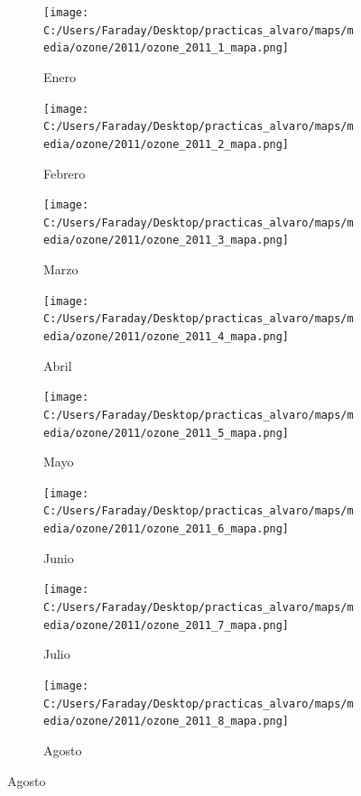 \documentclass[12pt]{beamer}
\begin{document}
\begin{frame}[squeeze]
\tiny
\begin{figure}[H]
\centering
\begin{subfigure}[H]{0.20\textwidth}
\texttt{[image: C:/Users/Faraday/Desktop/practicas\_alvaro/maps/media/ozone/2011/ozone\_2011\_1\_mapa.png]}
\captionsetup{labelformat=empty}
\caption{\scriptsize Enero}
\label{fig:map-ozone-2011-1}
\end{subfigure}
%
\begin{subfigure}[H]{0.20\textwidth}
\texttt{[image: C:/Users/Faraday/Desktop/practicas\_alvaro/maps/media/ozone/2011/ozone\_2011\_2\_mapa.png]}
\captionsetup{labelformat=empty}
\caption{\scriptsize Febrero}
\label{fig:map-ozone-2011-2}
\end{subfigure}
%
\begin{subfigure}[H]{0.20\textwidth}
\texttt{[image: C:/Users/Faraday/Desktop/practicas\_alvaro/maps/media/ozone/2011/ozone\_2011\_3\_mapa.png]}
\captionsetup{labelformat=empty}
\caption{\scriptsize Marzo}
\label{fig:map-ozone-2011-3}
\end{subfigure}
%
\begin{subfigure}[H]{0.20\textwidth}
\texttt{[image: C:/Users/Faraday/Desktop/practicas\_alvaro/maps/media/ozone/2011/ozone\_2011\_4\_mapa.png]}
\captionsetup{labelformat=empty}
\caption{\scriptsize Abril}
\label{fig:map-ozone-2011-4}
\end{subfigure}

\begin{subfigure}[H]{0.20\textwidth}
\texttt{[image: C:/Users/Faraday/Desktop/practicas\_alvaro/maps/media/ozone/2011/ozone\_2011\_5\_mapa.png]}
\captionsetup{labelformat=empty}
\caption{\scriptsize Mayo}
\label{fig:map-ozone-2011-5}
\end{subfigure}
%
\begin{subfigure}[H]{0.20\textwidth}
\texttt{[image: C:/Users/Faraday/Desktop/practicas\_alvaro/maps/media/ozone/2011/ozone\_2011\_6\_mapa.png]}
\captionsetup{labelformat=empty}
\caption{\scriptsize Junio}
\label{fig:map-ozone-2011-6}
\end{subfigure}
%
\begin{subfigure}[H]{0.20\textwidth}
\texttt{[image: C:/Users/Faraday/Desktop/practicas\_alvaro/maps/media/ozone/2011/ozone\_2011\_7\_mapa.png]}
\captionsetup{labelformat=empty}
\caption{\scriptsize Julio}
\label{fig:map-ozone-2011-7}
\end{subfigure}
%
\begin{subfigure}[H]{0.20\textwidth}
\texttt{[image: C:/Users/Faraday/Desktop/practicas\_alvaro/maps/media/ozone/2011/ozone\_2011\_8\_mapa.png]}
\captionsetup{labelformat=empty}
\caption{\scriptsize Agosto}
\label{fig:map-ozone-2011-8}
\end{subfigure}


\end{figure}
\end{frame}
\end{document}
